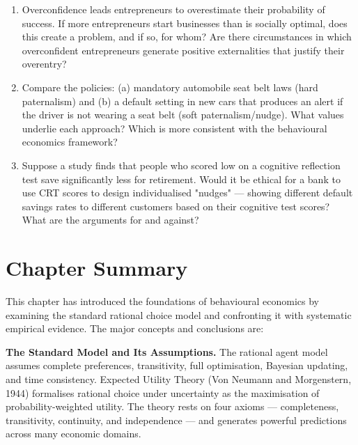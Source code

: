 \documentclass[12pt, letterpaper]{article}
\begin{document}
\begin{enumerate}
\item Overconfidence leads entrepreneurs to overestimate their probability of success. If more entrepreneurs start businesses than is socially optimal, does this create a problem, and if so, for whom? Are there circumstances in which overconfident entrepreneurs generate positive externalities that justify their overentry?

\item Compare the policies: (a) mandatory automobile seat belt laws (hard paternalism) and (b) a default setting in new cars that produces an alert if the driver is not wearing a seat belt (soft paternalism/nudge). What values underlie each approach? Which is more consistent with the behavioural economics framework?

\item Suppose a study finds that people who scored low on a cognitive reflection test save significantly less for retirement. Would it be ethical for a bank to use CRT scores to design individualised "nudges" --- showing different default savings rates to different customers based on their cognitive test scores? What are the arguments for and against?
\end{enumerate}

\newpage


\section*{Chapter Summary}


This chapter has introduced the foundations of behavioural economics by examining the standard rational choice model and confronting it with systematic empirical evidence. The major concepts and conclusions are:

\textbf{The Standard Model and Its Assumptions.} The rational agent model assumes complete preferences, transitivity, full optimisation, Bayesian updating, and time consistency. Expected Utility Theory (Von Neumann and Morgenstern, 1944) formalises rational choice under uncertainty as the maximisation of probability-weighted utility. The theory rests on four axioms --- completeness, transitivity, continuity, and independence --- and generates powerful predictions across many economic domains.
\end{document}
